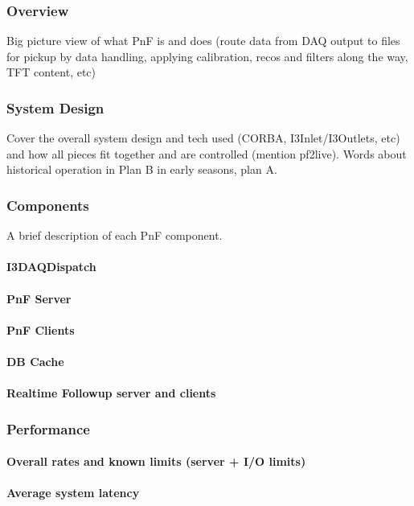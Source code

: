 \subsubsection{Overview}
Big picture view of what PnF is and does (route data from DAQ output to
files for pickup by data handling, applying calibration, recos and
filters along the way, TFT content, etc)

\subsubsection{System Design}
Cover the overall system design and tech used (CORBA, I3Inlet/I3Outlets,
etc) and how all pieces fit together and are controlled (mention
pf2live). Words about historical operation in Plan B in early seasons,
plan A.

\subsubsection{Components}
A brief description of each PnF component.
\paragraph{I3DAQDispatch}
\paragraph{PnF Server}
\paragraph{PnF Clients}
\paragraph{DB Cache}
\paragraph{Realtime Followup server and clients}

\subsubsection{Performance}
\paragraph{Overall rates and known limits (server + I/O limits)}
\paragraph{Average system latency}

